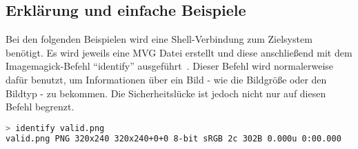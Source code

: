 \subsection{Erklärung und einfache Beispiele}\label{subsec:erklaerung-und-einfache-beispiele}

Bei den folgenden Beispielen wird eine Shell-Verbindung zum Zielsystem benötigt.
Es wird jeweils eine MVG Datei erstellt und diese anschließend mit dem Imagemagick-Befehl "`identify"' ausgeführt~\cite{PHPImagickIdentifyImage}.
Dieser Befehl wird normalerweise dafür benutzt,
um Informationen über ein Bild - wie die Bildgröße oder den Bildtyp - zu bekommen.
Die Sicherheitslücke ist jedoch nicht nur auf diesen Befehl begrenzt.\\

\begin{lstlisting}[language=Bash, caption=Erklaerung - Identify einer validen PNG Datei,label={lst:lstlisting}]
> identify valid.png
valid.png PNG 320x240 320x240+0+0 8-bit sRGB 2c 302B 0.000u 0:00.000
\end{lstlisting}


